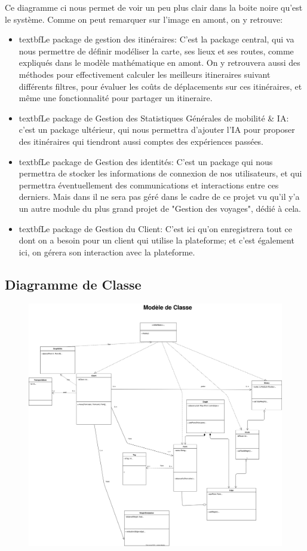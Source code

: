 Ce diagramme ci nous permet de voir un peu plus clair dans la boite noire qu'est le système. Comme on peut remarquer sur l'image en amont, on y retrouve:

\begin{itemize}
    \item textbf{Le package de gestion des itinéraires: } C'est la package central, qui va nous permettre de définir modéliser la carte, ses lieux et ses routes, comme expliqués dans le modèle mathématique en amont. On y retrouvera aussi des méthodes pour effectivement calculer les meilleurs itineraires suivant différents filtres, pour évaluer les coûts de déplacements sur ces itinéraires, et même une fonctionnalité pour partager un itineraire.
    \item textbf{Le package de Gestion des Statistiques Générales de mobilité \& IA}: c'est un package ultérieur, qui nous permettra d'ajouter l'IA pour proposer des itinéraires qui tiendront aussi comptes des expériences passées.
    \item textbf{Le package de Gestion des identités:} C'est un package qui nous permettra de stocker les informations de connexion de nos utilisateurs, et qui permettra éventuellement des communications et interactions entre ces derniers. Mais dans il ne sera pas géré dans le cadre de ce projet vu qu'il y'a un autre module du plus grand projet de "Gestion des voyages", dédié à cela.
    \item textbf{Le package de Gestion du Client}: C'est ici qu'on enregistrera tout ce dont on a besoin pour un client qui utilise la plateforme; et c'est également ici, on gérera son interaction avec la plateforme.
\end{itemize}

\subsection{Diagramme de Classe}

\begin{figure}[h]
    \centering
    \includegraphics[width=0.8\linewidth]{Images/Diagramme_Classe.png}
\end{figure}

